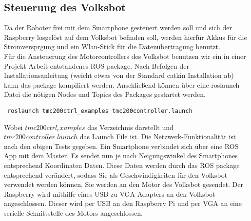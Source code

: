 \documentclass[12pt]{article}
\begin{document}




	

\subsection{Steuerung des Volksbot}

Da der Roboter frei mit dem Smartphone gesteuert werden soll und sich der Raspberry losgelöst auf dem Volksbot befinden soll, werden hierfür Akkus für die Stromversprgung und ein Wlan-Stick für die Datenübertragung benutzt. \\
Für die Ansteuerung des Motorcontrollers des Volksbot benutzen wir ein in einer Projekt Arbeit entstandenes ROS package. \cite{Motorsteuerung}
Nach Befolgen der Installationsanleitung (weicht etwas von der Standard catkin Installation ab) kann das package kompiliert werden.
Anschließend können über eine roslaunch Datei die nötigen Nodes und Topics des Packages gestartet werden.

 \begin{lstlisting}
 roslaunch tmc200ctrl_examples tmc200controller.launch
 \end{lstlisting}
 
Wobei $tmc200ctrl_examples$ das Verzeichnis darstellt und \\ $tmc200controller.launch$ das Launch File ist.
Die Netzwerk-Funktionalität ist nach den obigen Tests gegeben.
Ein Smartphone verbindet sich über eine ROS App \cite{TeleopApp} mit dem Master.
Es sendet nun je nach Neigungswinkel des Smartphones entsprechend Koordinaten Daten.
Diese Daten werden durch das ROS package entsprechend verändert, sodass Sie als Geschwindigkeiten für den Volksbot verwendet werden können.
Sie werden an den Motor des Volksbot gesendet.
Der Raspberry wird mithilfe eines USB zu VGA Adapters an den Volksbot angeschlossen. Dieser wird per USB an den Raspberry Pi und per VGA an eine serielle Schnittstelle des Motors angeschlossen.
\end{document}
